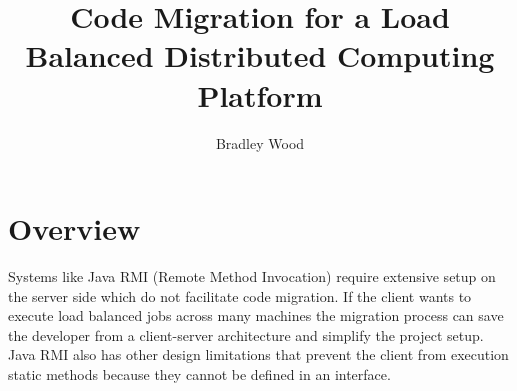 \documentclass[10pt, oneside,english]{article}
\title{Code Migration for a Load Balanced Distributed Computing Platform}
\author[1]{Bradley Wood}
\affil[ ]{University of Ontario Institute of Technology}
\date{}
\begin{document}
    \maketitle

    \section{Overview}\label{sec:overview}

    Systems like Java RMI (Remote Method Invocation) require extensive setup on the
    server side which do not facilitate code migration.
    If the client wants to execute load balanced jobs across many machines
    the migration process can save the developer from a client-server architecture
    and simplify the project setup.
    Java RMI also has other design limitations that prevent the client from execution static
    methods because they cannot be defined in an interface.
\end{document}
